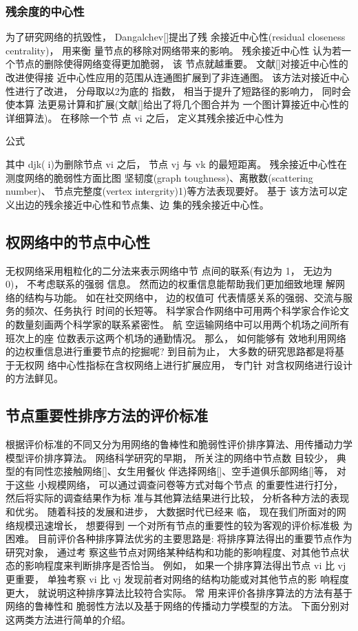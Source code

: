 	\subsubsection{残余度的中心性}
	为了研究网络的抗毁性， Dangalchev[]提出了残 余接近中心性(residual closeness centrality)， 用来衡 量节点的移除对网络带来的影响。 残余接近中心性 认为若一个节点的删除使得网络变得更加脆弱， 该 节点就越重要。 文献[]对接近中心性的改进使得接 近中心性应用的范围从连通图扩展到了非连通图。 该方法对接近中心性进行了改进， 分母取以2为底的 指数， 相当于提升了短路径的影响力， 同时会使本算 法更易计算和扩展(文献[]给出了将几个图合并为 一个图计算接近中心性的详细算法)。 在移除一个节 点 vi 之后， 定义其残余接近中心性为

				公式

				其中 djk(i)为删除节点 vi 之后， 节点 vj 与 vk 的最短距离。 残余接近中心性在测度网络的脆弱性方面比图 坚韧度(graph toughness)、离散数(scattering number)、 节点完整度(vertex intergrity)1)等方法表现要好。 基于 该方法可以定义出边的残余接近中心性和节点集、边 集的残余接近中心性。

	\subsection{权网络中的节点中心性}
	无权网络采用粗粒化的二分法来表示网络中节 点间的联系(有边为 1， 无边为 0)， 不考虑联系的强弱 信息。 然而边的权重信息能帮助我们更加细致地理 解网络的结构与功能。 如在社交网络中， 边的权值可 代表情感关系的强弱、交流与服务的频次、任务执行 时间的长短等。 科学家合作网络中可用两个科学家合作论文的数量刻画两个科学家的联系紧密性。 航 空运输网络中可以用两个机场之间所有班次上的座 位数表示这两个机场的通勤情况。 那么， 如何能够有 效地利用网络的边权重信息进行重要节点的挖掘呢? 到目前为止， 大多数的研究思路都是将基于无权网 络中心性指标在含权网络上进行扩展应用， 专门针 对含权网络进行设计的方法鲜见。



	\subsection{节点重要性排序方法的评价标准}
	根据评价标准的不同又分为用网络的鲁棒性和脆弱性评价排序算法、用传播动力学模型评价排序算法。
			网络科学研究的早期， 所关注的网络中节点数 目较少， 典型的有同性恋接触网络[]、女生用餐伙 伴选择网络[]、空手道俱乐部网络[]等， 对于这些 小规模网络， 可以通过调查问卷等方式对每个节点 的重要性进行打分， 然后将实际的调查结果作为标 准与其他算法结果进行比较， 分析各种方法的表现 和优劣。 随着科技的发展和进步， 大数据时代已经来 临， 现在我们所面对的网络规模迅速增长， 想要得到 一个对所有节点的重要性的较为客观的评价标准极 为困难。 目前评价各种排序算法优劣的主要思路是: 将排序算法得出的重要节点作为研究对象， 通过考 察这些节点对网络某种结构和功能的影响程度、对其他节点状态的影响程度来判断排序是否恰当。 例如， 如果一个排序算法得出节点 vi 比 vj 更重要， 单独考察 vi 比 vj 发现前者对网络的结构功能或对其他节点的影 响程度更大， 就说明这种排序算法比较符合实际。 常 用来评价各排序算法的方法有基于网络的鲁棒性和 脆弱性方法以及基于网络的传播动力学模型的方法。 下面分别对这两类方法进行简单的介绍。
